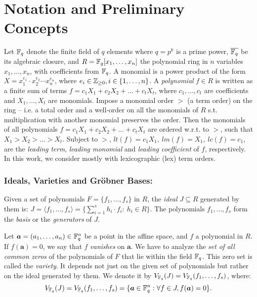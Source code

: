 \vspace{-0.1in}
\section{Notation and Preliminary Concepts}
\label{sec:prelim}
Let ${\mathbb{F}}_{q}$ denote the finite field of $q$ elements where $q=p^k$ is a
prime power, ${\overline{{\mathbb{F}}_q}}$ be its algebraic closure, and $R = {\mathbb{F}}_{q}[x_1,\dots,x_n]$ the
polynomial ring in $n$ variables $x_1,\dots,x_n$, with coefficients
from ${\mathbb{F}}_{q}$. A monomial is a power product of the form  $X =
x_1^{e_{1}}\cdot x_2^{e_{2}}\cdots x_n^{e_{n}}$, where  
$e_i \in {\mathbb{Z}}_{\geq 0}, i\in \{1, \dots,n\}$. A {\it polynomial} $f \in
R$ is written as a finite sum of terms   
$f = c_1 X_1 + c_2 X_2 + \dots + c_t X_t$, where $c_1, \dots, c_t$ are 
coefficients and $X_1, \dots, X_t$ are monomials. Impose a monomial
order $>$ (a term order) on the ring -- i.e. a total order and a
well-order on all the monomials of $R$ s.t. multiplication with
another monomial preserves the order. Then the monomials of all
polynomials $f = c_1 X_1 + c_2 X_2 + \dots + c_t X_t$ 
are ordered w.r.t. to $>$, such that  $X_1 > X_2 > \dots >  X_t$.
Subject to $>$, $lt(f) = c_1 X_1, ~lm(f) = X_1, ~lc(f) = c_1$,
are the {\it leading term}, {\it leading monomial} and {\it   leading
  coefficient} of $f$, respectively. In this work, 
we consider mostly with lexicographic (lex) term orders.

\subsubsection{Ideals, Varieties and Gr\"obner Bases:} 
Given a set of polynomials $F = \{f_1, \dots, f_s\}$ in $R$, the {\it
  ideal} $J \subseteq R$ generated by them is: %
$J = \langle f_1, \dots, f_s \rangle = \{\sum_{i=1}^{s} h_i\cdot f_i:
~h_i \in R\}.$ The polynomials $f_1, \dots, f_s$
form the {\it basis} or the {\it   generators} of $J$.    


Let $\bm{a} = (a_1,\dots,a_n) \in {\mathbb{F}}_{q}^n$ be a point in the affine
space, and $f$ a polynomial in $R$. If $f(\bm{a}) = 0$, we say
that $f$ {\it vanishes} on $\bm{a}$. We have to
analyze the {\it set of all common zeros} of the polynomials of $F$
that lie %
within the field ${\mathbb{F}}_{q}$. This zero set is called the {\it variety}. It
depends not just on the given set of polynomials but rather on the
ideal generated by them. We denote it by $V_{{\mathbb{F}}_{q}}(J) =
V_{{\mathbb{F}}_{q}}(f_1,\dots,f_s)$, where: 
$$V_{{\mathbb{F}}_{q}}(J) = V_{{\mathbb{F}}_{q}}(f_1, \dots, f_s) = \{\bm{a} \in {\mathbb{F}}_{q}^n: \forall
f \in J, f(\bm{a}) = 0\}.$$

